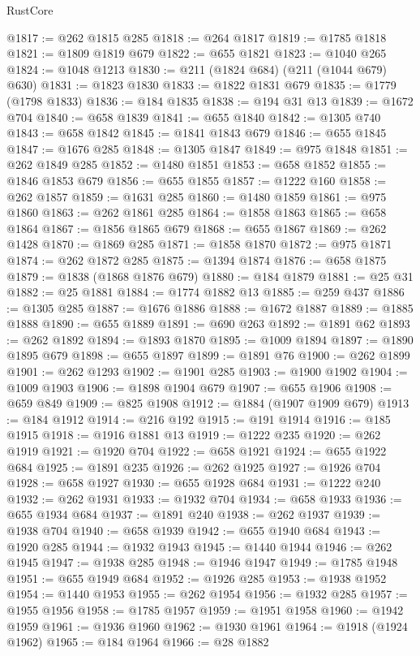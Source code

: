 \begin{lexlean}{RustCore}
\begin{coremodule}
@1817 := @262 @1815 @285
@1818 := @264 @1817
@1819 := @1785 @1818
@1821 := @1809 @1819 @679
@1822 := @655 @1821
@1823 := @1040 @265
@1824 := @1048 @1213
@1830 := @211 (@1824 @684) (@211 (@1044 @679) @630)
@1831 := @1823 @1830
@1833 := @1822 @1831 @679
@1835 := @1779 (@1798 @1833)
@1836 := @184 @1835
@1838 := @194 @31 @13
@1839 := @1672 @704
@1840 := @658 @1839
@1841 := @655 @1840
@1842 := @1305 @740
@1843 := @658 @1842
@1845 := @1841 @1843 @679
@1846 := @655 @1845
@1847 := @1676 @285
@1848 := @1305 @1847
@1849 := @975 @1848
@1851 := @262 @1849 @285
@1852 := @1480 @1851
@1853 := @658 @1852
@1855 := @1846 @1853 @679
@1856 := @655 @1855
@1857 := @1222 @160
@1858 := @262 @1857
@1859 := @1631 @285
@1860 := @1480 @1859
@1861 := @975 @1860
@1863 := @262 @1861 @285
@1864 := @1858 @1863
@1865 := @658 @1864
@1867 := @1856 @1865 @679
@1868 := @655 @1867
@1869 := @262 @1428
@1870 := @1869 @285
@1871 := @1858 @1870
@1872 := @975 @1871
@1874 := @262 @1872 @285
@1875 := @1394 @1874
@1876 := @658 @1875
@1879 := @1838 (@1868 @1876 @679)
@1880 := @184 @1879
@1881 := @25 @31
@1882 := @25 @1881
@1884 := @1774 @1882 @13
@1885 := @259 @437
@1886 := @1305 @285
@1887 := @1676 @1886
@1888 := @1672 @1887
@1889 := @1885 @1888
@1890 := @655 @1889
@1891 := @690 @263
@1892 := @1891 @62
@1893 := @262 @1892
@1894 := @1893 @1870
@1895 := @1009 @1894
@1897 := @1890 @1895 @679
@1898 := @655 @1897
@1899 := @1891 @76
@1900 := @262 @1899
@1901 := @262 @1293
@1902 := @1901 @285
@1903 := @1900 @1902
@1904 := @1009 @1903
@1906 := @1898 @1904 @679
@1907 := @655 @1906
@1908 := @659 @849
@1909 := @825 @1908
@1912 := @1884 (@1907 @1909 @679)
@1913 := @184 @1912
@1914 := @216 @192
@1915 := @191 @1914
@1916 := @185 @1915
@1918 := @1916 @1881 @13
@1919 := @1222 @235
@1920 := @262 @1919
@1921 := @1920 @704
@1922 := @658 @1921
@1924 := @655 @1922 @684
@1925 := @1891 @235
@1926 := @262 @1925
@1927 := @1926 @704
@1928 := @658 @1927
@1930 := @655 @1928 @684
@1931 := @1222 @240
@1932 := @262 @1931
@1933 := @1932 @704
@1934 := @658 @1933
@1936 := @655 @1934 @684
@1937 := @1891 @240
@1938 := @262 @1937
@1939 := @1938 @704
@1940 := @658 @1939
@1942 := @655 @1940 @684
@1943 := @1920 @285
@1944 := @1932 @1943
@1945 := @1440 @1944
@1946 := @262 @1945
@1947 := @1938 @285
@1948 := @1946 @1947
@1949 := @1785 @1948
@1951 := @655 @1949 @684
@1952 := @1926 @285
@1953 := @1938 @1952
@1954 := @1440 @1953
@1955 := @262 @1954
@1956 := @1932 @285
@1957 := @1955 @1956
@1958 := @1785 @1957
@1959 := @1951 @1958
@1960 := @1942 @1959
@1961 := @1936 @1960
@1962 := @1930 @1961
@1964 := @1918 (@1924 @1962)
@1965 := @184 @1964
@1966 := @28 @1882

\end{coremodule}
\end{lexlean}
